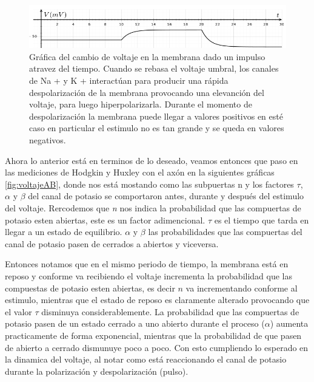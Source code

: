 \begin{figure}[h]
 \centering
 \includegraphics[scale=0.5]{../Figuras/polarizacion2.png}
 \caption{Gráfica del cambio de voltaje en la membrana dado un impulso atravez del tiempo. Cuando se rebasa el voltaje umbral, los canales de Na + y K + interactúan para producir una rápida despolarización de la membrana provocando una elevanción del voltaje, para luego hiperpolarizarla. Durante el momento de despolarización la membrana puede llegar a valores positivos en esté caso en particular el estimulo no es tan grande y se queda en valores negativos.}
 \label{fig:voltaje2}
\end{figure}

Ahora lo anterior está en terminos de lo deseado, veamos entonces que paso en las mediciones de Hodgkin y Huxley con el axón en la siguientes gráficas \ref{fig:voltajeAB}, donde nos está mostando como las subpuertas n y los factores \(\tau\), \(\alpha\) y \(\beta\) del canal de potasio se comportaron antes, durante y después del estimulo del voltaje. Rercodemos que \emph{n} nos indica la probabilidad que las compuertas de potasio esten abiertas, este es un factor adimencional. \(\tau\) es el tiempo que tarda en llegar a un estado de equilibrio. \(\alpha\) y \(\beta\) las probabilidades que las compuertas del canal de potasio pasen de cerrados a abiertos y viceversa. 

Entonces notamos que en el mismo periodo de tiempo, la membrana está en reposo y conforme va recibiendo el voltaje incrementa la probabilidad que las compuestas de potasio esten abiertas, es decir \(n\) va incrementando conforme al estimulo, mientras que el estado de reposo es claramente alterado provocando que el valor \(\tau\) disminuya considerablemente. La probabilidad que las compuertas de potasio pasen de un estado cerrado a uno abierto durante el proceso (\(\alpha\)) aumenta practicamente de forma exponencial, mientras que la probabilidad de que pasen de abierto a cerrado dismunuye poco a poco. Con esto cumpliendo lo esperado en la dinamica del voltaje, al notar como está reaccionando el canal de potasio durante la polarización y despolarización (pulso). 


